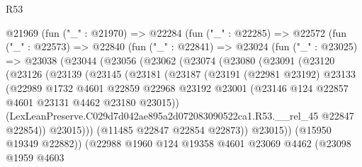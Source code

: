 \begin{lexlean}{R53}
\begin{coremodule}
        @21969
          (fun ("_" : @21970) =>
          @22284
            (fun ("_" : @22285) =>
            @22572
              (fun ("_" : @22573) =>
              @22840
                (fun ("_" : @22841) =>
                @23024
                  (fun ("_" : @23025) =>
                  @23038
                    (@23044
                      (@23056
                        (@23062
                          (@23074
                            (@23080
                              (@23091
                                (@23120
                                  (@23126
                                    (@23139
                                      (@23145
                                        (@23181
                                          (@23187
                                            (@23191
                                              (@22981 @23192)
                                              @23133
                                              (@22989
                                                @1732
                                                @4601
                                                @22859
                                                @22968
                                                @23192
                                                @23001
                                                (@23146
                                                  @124
                                                  @22857
                                                  @4601
                                                  @23131
                                                  @4462
                                                  @23180
                                                  @23015))
                                              (LexLeanPreserve.C029d7d042ae895a2d072083090522ca1.R53.__rel_45
                                                @22847
                                                @22854))
                                            @23015)))
                                      (@11485 @22847 @22854 @22873))
                                    @23015))
                                (@15950 @19349 @22882))
                              (@22988
                                @1960
                                @124
                                @19358
                                @4601
                                @23069
                                @4462
                                (@23098
                                  @1959
                                  @4603

\end{coremodule}
\end{lexlean}
